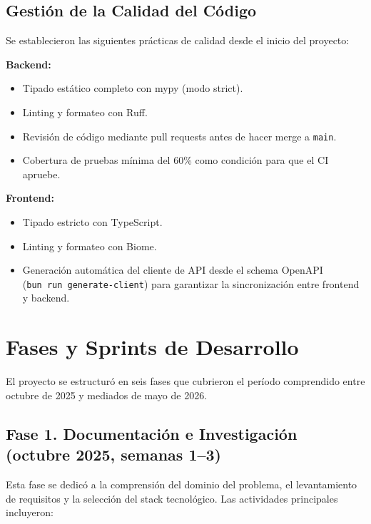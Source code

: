 \subsection{Gestión de la Calidad del Código}\label{gestiuxf3n-de-la-calidad-del-cuxf3digo}

Se establecieron las siguientes prácticas de calidad desde el inicio del proyecto:

\textbf{Backend:}

\begin{itemize}
\tightlist
\item
  Tipado estático completo con mypy (modo strict).
\item
  Linting y formateo con Ruff.
\item
  Revisión de código mediante pull requests antes de hacer merge a \texttt{main}.
\item
  Cobertura de pruebas mínima del 60\% como condición para que el CI apruebe.
\end{itemize}

\textbf{Frontend:}

\begin{itemize}
\tightlist
\item
  Tipado estricto con TypeScript.
\item
  Linting y formateo con Biome.
\item
  Generación automática del cliente de API desde el schema OpenAPI (\texttt{bun\ run\ generate-client}) para garantizar la sincronización entre frontend y backend.
\end{itemize}

\section{Fases y Sprints de Desarrollo}\label{fases-y-sprints-de-desarrollo}

El proyecto se estructuró en seis fases que cubrieron el período comprendido entre octubre de 2025 y mediados de mayo de 2026.

\subsection{Fase 1. Documentación e Investigación (octubre 2025, semanas 1--3)}\label{fase-1.-documentaciuxf3n-e-investigaciuxf3n-octubre-2025-semanas-13}

Esta fase se dedicó a la comprensión del dominio del problema, el levantamiento de requisitos y la selección del stack tecnológico. Las actividades principales incluyeron:

